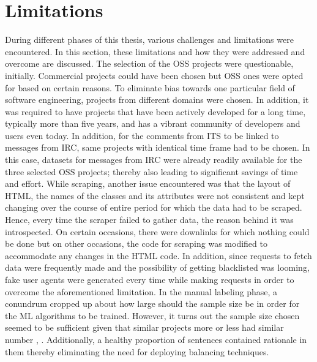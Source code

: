 \documentclass[a4paper,12pt,twoside]{report}
\begin{document}
\section{Limitations}
During different phases of this thesis, various challenges and limitations were encountered. In this section, these limitations and how they were addressed and overcome are discussed. 
\newline \newline
The selection of the OSS projects were questionable, initially. Commercial projects could have been chosen but OSS ones were opted for based on certain reasons. To eliminate bias towards one particular field of software engineering, projects from different domains were chosen. In addition, it was required to have projects that have been actively developed for a long time, typically more than five years, and has a vibrant community of developers and users even today. In addition, for the comments from ITS to be linked to messages from IRC, same projects with identical time frame had to be chosen. In this case, datasets for messages from IRC were already readily available for the three selected OSS projects; thereby also leading to significant savings of time and effort. 
\newline \newline
While scraping, another issue encountered was that the layout of HTML, the names of the classes and its attributes were not consistent and kept changing over the course of entire period for which the data had to be scraped. Hence, every time the scraper failed to gather data, the reason behind it was introspected. On certain occasions, there were downlinks for which nothing could be done but on other occasions, the code for scraping was modified to accommodate any changes in the HTML code. In addition, since requests to fetch data were frequently made and the possibility of getting blacklisted was looming, fake user agents were generated every time while making requests in order to overcome the aforementioned limitation. 
\newline \newline
In the manual labeling phase, a conundrum cropped up about how large should the sample size be in order for the ML algorithms to be trained. However, it turns out the sample size chosen seemed to be sufficient given that similar projects more or less had similar number \cite{Alkadhi2017}, \cite{Nonnenmacher2017}. Additionally, a healthy proportion of sentences contained rationale in them thereby eliminating the need for deploying balancing techniques.  
\end{document}
